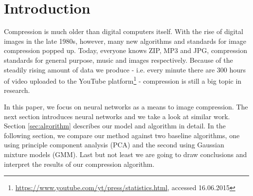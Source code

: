 
\section{Introduction} \label{sec:introduction}
 
Compression is much older than digital computers itself\cite{wolfram2002}. With the rise of digital images in the late 1980s, however, many new algorithms and standards for image compression popped up. Today, everyone knows ZIP, MP3 and JPG, compression standards for general purpose, music and images respectively. Because of the steadily rising amount of data we produce - i.e. every minute there are 300 hours of video uploaded to the YouTube platform\footnote{\url{https://www.youtube.com/yt/press/statistics.html}, accessed 16.06.2015} - compression is still a big topic in research.

In this paper, we focus on neural networks as a means to image compression. The next section introduces neural networks and we take a look at similar work. Section \ref{sec:algorithm} describes our model and algorithm in detail. In the following section, we compare our method against two baseline algorithms, one using principle component analysis (PCA) and the second using Gaussian mixture models (GMM). Last but not least we are going to draw conclusions and interpret the results of our compression algorithm.

